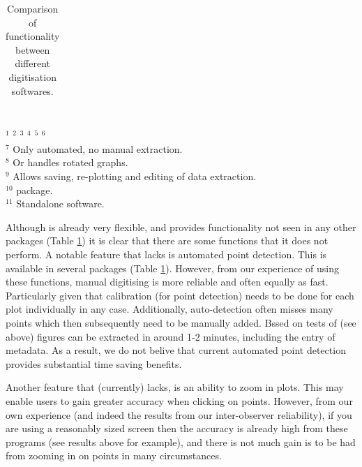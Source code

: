 \documentclass[article]{jss}
\begin{document}
\begin{table}
{\begin{tabular}{lccccccc}

\end{tabular}
}
{\footnotesize
\\
$^1$ \citet{GraphClick}
$^2$ \citet{DataThief}
$^3$ \citet{DigitizeIt}
$^4$ \citet{WebPlotDigitizer}
$^5$ \citet{Lajeunesse2016}
$^6$ \citet{Poisot2011}
\\$^7$ Only automated, no manual extraction.
\\$^8$ Or handles rotated graphs. 
\\$^9$ Allows saving, re-plotting and editing of data extraction.
\\$^{10}$  package.
\\$^{11}$ Standalone software.
}

\caption{\label{tab:comparison} Comparison of functionality between different digitisation softwares.}

\end{table}


Although  is already very flexible, and provides functionality not seen in any other packages (Table \ref{tab:comparison}) it is clear that there are some functions that it does not perform. A notable feature that  lacks is automated point detection. This is available in several packages (Table \ref{tab:comparison}). However, from our experience of using these functions, manual digitising is more reliable and often equally as fast. Particularly given that calibration (for point detection) needs to be done for each plot individually in any case. Additionally, auto-detection often misses many points which then subsequently need to be manually added. Bssed on tests of  (see above) figures can be extracted in around 1-2 minutes, including the entry of metadata. As a result, we do not belive that current automated point detection provides substantial time saving benefits.

Another feature that  (currently) lacks, is an ability to zoom in plots. This may enable users to gain greater accuracy when clicking on points. However, from our own experience (and indeed the results from our inter-observer reliability), if you are using a reasonably sized screen then the accuracy is already high from these programs (see results above for example), and there is not much gain is to be had from zooming in on points in many circumstances.
\end{document}
